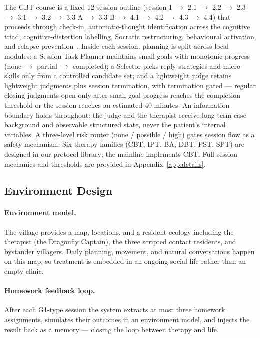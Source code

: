 \documentclass[10pt]{article}
\begin{document}
The CBT course is a fixed 12-session outline (session 1 $\rightarrow$ 2.1 $\rightarrow$ 2.2 $\rightarrow$ 2.3 $\rightarrow$ 3.1 $\rightarrow$ 3.2 $\rightarrow$ 3.3-A $\rightarrow$ 3.3-B $\rightarrow$ 4.1 $\rightarrow$ 4.2 $\rightarrow$ 4.3 $\rightarrow$ 4.4) that proceeds through check-in, automatic-thought identification across the cognitive triad, cognitive-distortion labelling, Socratic restructuring, behavioural activation, and relapse prevention~\citep{beck1979}.
Inside each session, planning is split across local modules: a Session Task Planner maintains small goals with monotonic progress (none $\rightarrow$ partial $\rightarrow$ completed); a Selector picks reply strategies and micro-skills only from a controlled candidate set; and a lightweight judge retains lightweight judgments plus session termination, with termination gated --- regular closing judgments open only after small-goal progress reaches the completion threshold or the session reaches an estimated 40 minutes.
An information boundary holds throughout: the judge and the therapist receive long-term case background and observable structured state, never the patient's internal variables.
A three-level risk router (none / possible / high) gates session flow as a safety mechanism.
Six therapy families (CBT, IPT, BA, DBT, PST, SPT) are designed in our protocol library; the mainline implements CBT.
Full session mechanics and thresholds are provided in Appendix~\ref{app:details}.

\subsection{Environment Design}\label{sec:environment}

\paragraph{Environment model.}
The village provides a map, locations, and a resident ecology including the therapist (the Dragonfly Captain), the three scripted contact residents, and bystander villagers.
Daily planning, movement, and natural conversations happen on this map, so treatment is embedded in an ongoing social life rather than an empty clinic.

\paragraph{Homework feedback loop.}
After each G1-type session the system extracts at most three homework assignments, simulates their outcomes in an environment model, and injects the result back as a memory --- closing the loop between therapy and life.
\end{document}
